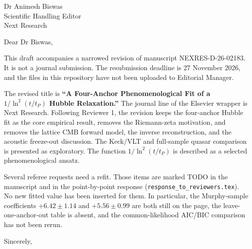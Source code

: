 \documentclass[11pt]{letter}
\begin{document}
\begin{letter}{Dr Animesh Biswas\\Scientific Handling Editor\\Next Research}

\opening{Dear Dr Biswas,}

This draft accompanies a narrowed revision of manuscript NEXRES-D-26-02183.
It is not a journal submission.
The resubmission deadline is 27 November 2026, and the files in this repository have not been uploaded to Editorial Manager.

The revised title is \textbf{``A Four-Anchor Phenomenological Fit of a $1/\ln^2(t/t_P)$ Hubble Relaxation.''}
The journal line of the Elsevier wrapper is Next Research.
Following Reviewer 1, the revision keeps the four-anchor Hubble fit as the core empirical result, removes the Riemann-zeta motivation, and removes the lattice CMB forward model, the inverse reconstruction, and the acoustic freeze-out discussion.
The Keck/VLT and full-sample quasar comparison is presented as exploratory.
The function $1/\ln^2(t/t_P)$ is described as a selected phenomenological ansatz.

Several referee requests need a refit.
Those items are marked TODO in the manuscript and in the point-by-point response (\texttt{response\_to\_reviewers.tex}).
No new fitted value has been inserted for them.
In particular, the Murphy-sample coefficients $+6.42\pm 1.14$ and $+5.56\pm 0.99$ are both still on the page, the leave-one-anchor-out table is absent, and the common-likelihood AIC/BIC comparison has not been rerun.

\closing{Sincerely,}

\end{letter}
\end{document}
